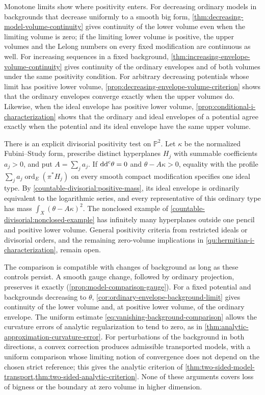 Monotone limits show where positivity enters. For decreasing ordinary models in backgrounds that decrease uniformly to a smooth big form, \cref{thm:decreasing-model-volume-continuity} gives continuity of the lower volume even when the limiting volume is zero; if the limiting lower volume is positive, the upper volumes and the Lelong numbers on every fixed modification are continuous as well. For increasing sequences in a fixed background, \cref{thm:increasing-envelope-volume-continuity} gives continuity of the ordinary envelopes and of both volumes under the same positivity condition. For arbitrary decreasing potentials whose limit has positive lower volume, \cref{prop:decreasing-envelope-volume-criterion} shows that the ordinary envelopes converge exactly when the upper volumes do. Likewise, when the ideal envelope has positive lower volume, \cref{prop:conditional-i-characterization} shows that the ordinary and ideal envelopes of a potential agree exactly when the potential and its ideal envelope have the same upper volume.

There is an explicit divisorial positivity test on $\mathbb P^2$. Let $\kappa$ be the normalized Fubini--Study form, prescribe distinct hyperplanes $H_j$ with summable coefficients $a_j>0$, and put $A=\sum_ja_j$. If $\mathrm{dd}^{\mathrm{c}}\theta=0$ and $\theta-A\kappa>0$, equality with the profile $\sum_ja_j\operatorname{ord}_E(\pi^*H_j)$ on every smooth compact modification specifies one ideal type. By \cref{countable-divisorial:positive-mass}, its ideal envelope is ordinarily equivalent to the logarithmic series, and every representative of this ordinary type has mass $\int_X(\theta-A\kappa)^2$. The nonclosed example of \cref{countable-divisorial:nonclosed-example} has infinitely many hyperplanes outside one pencil and positive lower volume. General positivity criteria from restricted ideals or divisorial orders, and the remaining zero-volume implications in \cref{qu:hermitian-i-characterization}, remain open.

The comparison is compatible with changes of background as long as these controls persist. A smooth gauge change, followed by ordinary projection, preserves it exactly (\cref{prop:model-comparison-gauge}). For a fixed potential and backgrounds decreasing to $\theta$, \cref{cor:ordinary-envelope-background-limit} gives continuity of the lower volume and, at positive lower volume, of the ordinary envelope. The uniform estimate \eqref{eq:vanishing-background-comparison} allows the curvature errors of analytic regularization to tend to zero, as in \cref{thm:analytic-approximation-curvature-error}. For perturbations of the background in both directions, a convex correction produces admissible transported models, with a uniform comparison whose limiting notion of convergence does not depend on the chosen strict reference; this gives the analytic criterion of \cref{thm:two-sided-model-transport,thm:two-sided-analytic-criterion}. None of these arguments covers loss of bigness or the boundary at zero volume in higher dimension.

